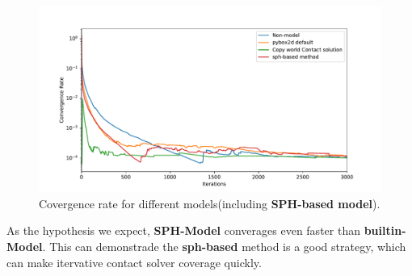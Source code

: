      \begin{figure}
        \centering
        \includegraphics[width=\textwidth]{Figures/addsph}
        \caption{Covergence rate for different models(including \textbf{SPH-based model}).}
        \label{fg:addsph}
    \end{figure}
    As the hypothesis we expect, \textbf{SPH-Model} converages even faster than \textbf{builtin-Model}. This can demonstrade the \textbf{sph-based} method is a good strategy, which can make itervative contact solver coverage quickly.
